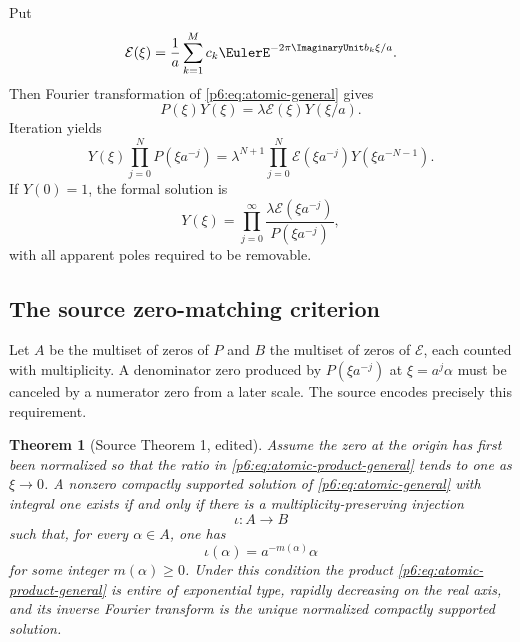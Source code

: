 \documentclass[11pt,oneside]{article}
\numberwithin{equation}{section}
\newtheorem{theorem}{Theorem}[section]
\theoremstyle{definition}
\theoremstyle{remark}
\begin{document}
Put
\begin{equation}\label{p6:eq:E-symbol}
 \mathcal E(\xi)=\frac1a\sum_{k=1}^{M}c_k
 \EulerE^{-2\pi\ImaginaryUnit b_k\xi/a}.
\end{equation}
Then Fourier transformation of \eqref{p6:eq:atomic-general} gives
\begin{equation}\label{p6:eq:fourier-atomic}
 P(\xi)Y(\xi)=\lambda\mathcal E(\xi)Y(\xi/a).
\end{equation}
Iteration yields
\begin{equation}\label{p6:eq:fourier-atomic-iterated}
 Y(\xi)\prod_{j=0}^{N}P(\xi a^{-j})
 =\lambda^{N+1}\prod_{j=0}^{N}\mathcal E(\xi a^{-j})
 Y(\xi a^{-N-1}).
\end{equation}
If $Y(0)=1$, the formal solution is
\begin{equation}\label{p6:eq:atomic-product-general}
 Y(\xi)=\prod_{j=0}^{\infty}
 \frac{\lambda\mathcal E(\xi a^{-j})}{P(\xi a^{-j})},
\end{equation}
with all apparent poles required to be removable.

\subsection{The source zero-matching criterion}

Let $A$ be the multiset of zeros of $P$ and $B$ the multiset of zeros of
$\mathcal E$, each counted with multiplicity.  A denominator zero produced by
$P(\xi a^{-j})$ at $\xi=a^j\alpha$ must be canceled by a numerator zero from a
later scale.  The source encodes precisely this requirement.

\begin{theorem}[Source Theorem 1, edited]\label{p6:thm:source-zero-matching}
Assume the zero at the origin has first been normalized so that the ratio in
\eqref{p6:eq:atomic-product-general} tends to one as $\xi\to0$.  A nonzero compactly
supported solution of \eqref{p6:eq:atomic-general} with integral one exists if and
only if there is a multiplicity-preserving injection
\[
 \iota:A\longrightarrow B
\]
such that, for every $\alpha\in A$, one has
\[
 \iota(\alpha)=a^{-m(\alpha)}\alpha
\]
for some integer $m(\alpha)\ge0$.  Under this condition the product
\eqref{p6:eq:atomic-product-general} is entire of exponential type, rapidly
decreasing on the real axis, and its inverse Fourier transform is the unique
normalized compactly supported solution.
\end{theorem}
\end{document}

